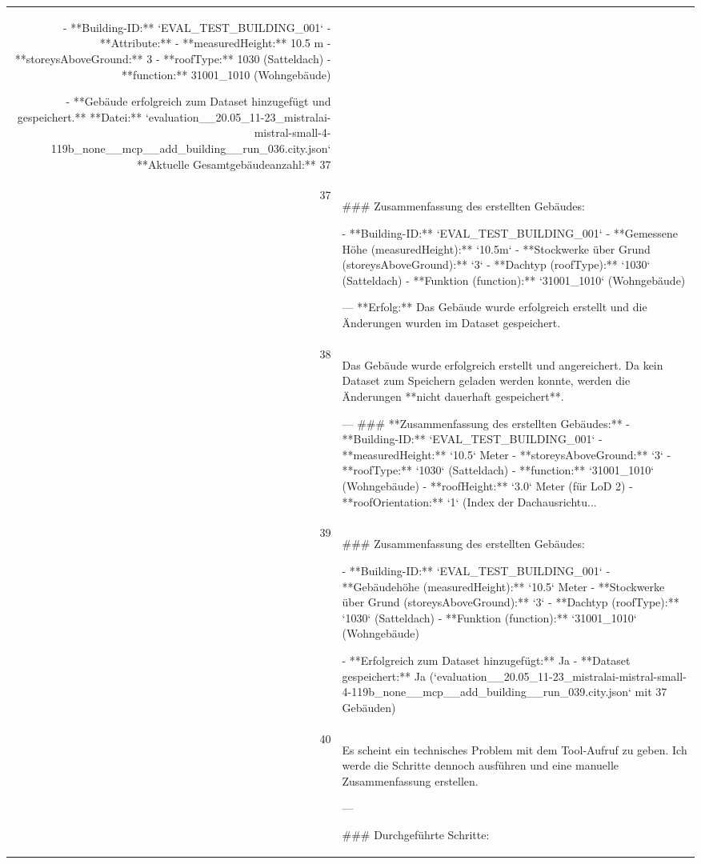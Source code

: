 \documentclass[a4paper,11pt]{article}
\begin{document}
\begin{table}[ht]
\begin{tabular}{r p{12cm}}
- **Building-ID:** `EVAL\_TEST\_BUILDING\_001`
- **Attribute:**
  - **measuredHeight:** 10.5 m
  - **storeysAboveGround:** 3
  - **roofType:** 1030 (Satteldach)
  - **function:** 31001\_1010 (Wohngebäude)

- **Gebäude erfolgreich zum Dataset hinzugefügt und gespeichert.**
  **Datei:** `evaluation\_\_20.05\_11-23\_mistralai-mistral-small-4-119b\_none\_\_mcp\_\_add\_building\_\_run\_036.city.json`
  **Aktuelle Gesamtgebäudeanzahl:** 37 \\
37 & \#\#\# Zusammenfassung des erstellten Gebäudes:

- **Building-ID:** `EVAL\_TEST\_BUILDING\_001`
- **Gemessene Höhe (measuredHeight):** `10.5m`
- **Stockwerke über Grund (storeysAboveGround):** `3`
- **Dachtyp (roofType):** `1030` (Satteldach)
- **Funktion (function):** `31001\_1010` (Wohngebäude)

---
**Erfolg:** Das Gebäude wurde erfolgreich erstellt und die Änderungen wurden im Dataset gespeichert. \\
38 & Das Gebäude wurde erfolgreich erstellt und angereichert. Da kein Dataset zum Speichern geladen werden konnte, werden die Änderungen **nicht dauerhaft gespeichert**.

---
\#\#\# **Zusammenfassung des erstellten Gebäudes:**
- **Building-ID:** `EVAL\_TEST\_BUILDING\_001`
- **measuredHeight:** `10.5` Meter
- **storeysAboveGround:** `3`
- **roofType:** `1030` (Satteldach)
- **function:** `31001\_1010` (Wohngebäude)
- **roofHeight:** `3.0` Meter (für LoD 2)
- **roofOrientation:** `1` (Index der Dachausrichtu... \\
39 & \#\#\# Zusammenfassung des erstellten Gebäudes:

- **Building-ID:** `EVAL\_TEST\_BUILDING\_001`
- **Gebäudehöhe (measuredHeight):** `10.5` Meter
- **Stockwerke über Grund (storeysAboveGround):** `3`
- **Dachtyp (roofType):** `1030` (Satteldach)
- **Funktion (function):** `31001\_1010` (Wohngebäude)

- **Erfolgreich zum Dataset hinzugefügt:** Ja
- **Dataset gespeichert:** Ja (`evaluation\_\_20.05\_11-23\_mistralai-mistral-small-4-119b\_none\_\_mcp\_\_add\_building\_\_run\_039.city.json` mit 37 Gebäuden) \\
40 & Es scheint ein technisches Problem mit dem Tool-Aufruf zu geben. Ich werde die Schritte dennoch ausführen und eine manuelle Zusammenfassung erstellen.

---

\#\#\# Durchgeführte Schritte:


\end{tabular}
\end{table}
\end{document}
